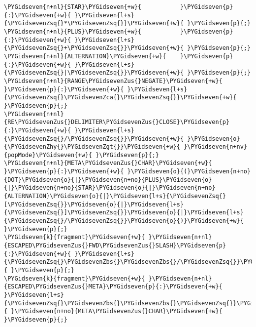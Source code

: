 \begin{Verbatim}[commandchars=\\\{\}]
\PYGidseven{n+nl}{STAR}\PYGidseven{+w}{           }\PYGidseven{p}{:}\PYGidseven{+w}{ }\PYGidseven{l+s}{\PYGidsevenZsq{}*\PYGidsevenZsq{}}\PYGidseven{+w}{ }\PYGidseven{p}{;}
\PYGidseven{n+nl}{PLUS}\PYGidseven{+w}{           }\PYGidseven{p}{:}\PYGidseven{+w}{ }\PYGidseven{l+s}{\PYGidsevenZsq{}+\PYGidsevenZsq{}}\PYGidseven{+w}{ }\PYGidseven{p}{;}
\PYGidseven{n+nl}{ALTERNATION}\PYGidseven{+w}{    }\PYGidseven{p}{:}\PYGidseven{+w}{ }\PYGidseven{l+s}{\PYGidsevenZsq{}|\PYGidsevenZsq{}}\PYGidseven{+w}{ }\PYGidseven{p}{;}
\PYGidseven{n+nl}{RANGE\PYGidsevenZus{}NEGATE}\PYGidseven{+w}{   }\PYGidseven{p}{:}\PYGidseven{+w}{ }\PYGidseven{l+s}{\PYGidsevenZsq{}\PYGidsevenZca{}\PYGidsevenZsq{}}\PYGidseven{+w}{ }\PYGidseven{p}{;}
\PYGidseven{n+nl}{RE\PYGidsevenZus{}DELIMITER\PYGidsevenZus{}CLOSE}\PYGidseven{p}{:}\PYGidseven{+w}{ }\PYGidseven{l+s}{\PYGidsevenZsq{}/\PYGidsevenZsq{}}\PYGidseven{+w}{ }\PYGidseven{o}{\PYGidsevenZhy{}\PYGidsevenZgt{}}\PYGidseven{+w}{ }\PYGidseven{n+nv}{popMode}\PYGidseven{+w}{ }\PYGidseven{p}{;}
\PYGidseven{n+nl}{META\PYGidsevenZus{}CHAR}\PYGidseven{+w}{      }\PYGidseven{p}{:}\PYGidseven{+w}{ }\PYGidseven{o}{(}\PYGidseven{n+no}{DOT}\PYGidseven{o}{|}\PYGidseven{n+no}{PLUS}\PYGidseven{o}{|}\PYGidseven{n+no}{STAR}\PYGidseven{o}{|}\PYGidseven{n+no}{ALTERNATION}\PYGidseven{o}{|}\PYGidseven{l+s}{\PYGidsevenZsq{}[\PYGidsevenZsq{}}\PYGidseven{o}{|}\PYGidseven{l+s}{\PYGidsevenZsq{}]\PYGidsevenZsq{}}\PYGidseven{o}{|}\PYGidseven{l+s}{\PYGidsevenZsq{}/\PYGidsevenZsq{}}\PYGidseven{o}{)}\PYGidseven{+w}{ }\PYGidseven{p}{;}
\PYGidseven{k}{fragment}\PYGidseven{+w}{ }\PYGidseven{n+nl}{ESCAPED\PYGidsevenZus{}FWD\PYGidsevenZus{}SLASH}\PYGidseven{p}{:}\PYGidseven{+w}{ }\PYGidseven{l+s}{\PYGidsevenZsq{}\PYGidsevenZbs{}\PYGidsevenZbs{}/\PYGidsevenZsq{}}\PYGidseven{+w}{ }\PYGidseven{p}{;}
\PYGidseven{k}{fragment}\PYGidseven{+w}{ }\PYGidseven{n+nl}{ESCAPED\PYGidsevenZus{}META}\PYGidseven{p}{:}\PYGidseven{+w}{ }\PYGidseven{l+s}{\PYGidsevenZsq{}\PYGidsevenZbs{}\PYGidsevenZbs{}\PYGidsevenZsq{}}\PYGidseven{+w}{ }\PYGidseven{n+no}{META\PYGidsevenZus{}CHAR}\PYGidseven{+w}{ }\PYGidseven{p}{;}


\end{Verbatim}
